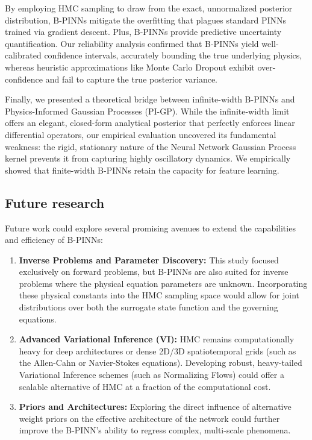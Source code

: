 \documentclass{article}
\begin{document}
By employing HMC sampling to draw from the exact, unnormalized posterior distribution, B-PINNs mitigate the overfitting that plagues standard PINNs trained via gradient descent. Plus, B-PINNs provide predictive uncertainty quantification. Our reliability analysis confirmed that B-PINNs yield well-calibrated confidence intervals, accurately bounding the true underlying physics, whereas heuristic approximations like Monte Carlo Dropout exhibit over-confidence and fail to capture the true posterior variance. 

Finally, we presented a theoretical bridge between infinite-width B-PINNs and Physics-Informed Gaussian Processes (PI-GP). While the infinite-width limit offers an elegant, closed-form analytical posterior that perfectly enforces linear differential operators, our empirical evaluation uncovered its fundamental weakness: the rigid, stationary nature of the Neural Network Gaussian Process kernel prevents it from capturing highly oscillatory dynamics. We empirically showed that finite-width B-PINNs retain the capacity for feature learning. 

\subsection{Future research}
Future work could explore several promising avenues to extend the capabilities and efficiency of B-PINNs:
\begin{enumerate}
    \item \textbf{Inverse Problems and Parameter Discovery:} This study focused exclusively on forward problems, but B-PINNs are also suited for inverse problems where the physical equation parameters are unknown. Incorporating these physical constants into the HMC sampling space would allow for joint distributions over both the surrogate state function and the governing equations.
    
    \item \textbf{Advanced Variational Inference (VI):} HMC remains computationally heavy for deep architectures or dense 2D/3D spatiotemporal grids (such as the Allen-Cahn or Navier-Stokes equations). Developing robust, heavy-tailed Variational Inference schemes (such as Normalizing Flows) could offer a scalable alternative of HMC at a fraction of the computational cost.
    
    \item \textbf{Priors and Architectures:} Exploring the direct influence of alternative weight priors on the effective architecture of the network could further improve the B-PINN's ability to regress complex, multi-scale phenomena.
\end{enumerate}
\end{document}
